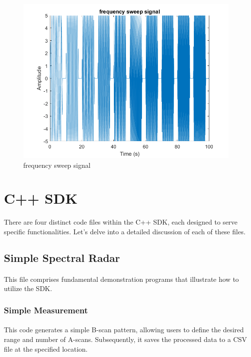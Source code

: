 \begin{figure}[H]\label{fig4.2}
\centering \includegraphics[scale=0.4]{Images/freqsweep2.png}
\caption{frequency sweep signal}
\end{figure}

\section{C++ SDK}
\paragraph{}
There are four distinct code files within the C++ SDK, each designed to serve specific functionalities. Let's delve into a detailed discussion of each of these files.

\subsection{Simple Spectral Radar}
\paragraph{}
This file comprises fundamental demonstration programs that illustrate how to utilize the SDK.

\subsubsection{Simple Measurement}
\paragraph{}
This code generates a simple B-scan pattern, allowing users to define the desired range and number of A-scans. Subsequently, it saves the processed data to a CSV file at the specified location.

